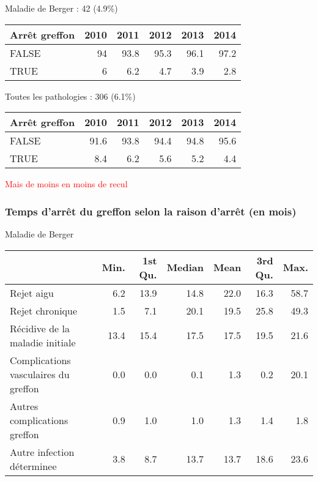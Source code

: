 \documentclass[11pt,a4paper]{article}\usepackage[]{graphicx}\usepackage[]{color}
\begin{document}
Maladie de Berger : 42 (4.9\%)

\begin{table}[H]
\centering
\begin{tabular}{lrrrrr}
  \hline
Arrêt greffon & 2010 & 2011 & 2012 & 2013 & 2014 \\ 
  \hline
FALSE & 94 & 93.8 & 95.3 & 96.1 & 97.2 \\ 
  TRUE & 6 & 6.2 & 4.7 & 3.9 & 2.8 \\ 
   \hline
\end{tabular}
\end{table}


Toutes les pathologies : 306 (6.1\%)

\begin{table}[H]
\centering
\begin{tabular}{lrrrrr}
  \hline
Arrêt greffon & 2010 & 2011 & 2012 & 2013 & 2014 \\ 
  \hline
FALSE & 91.6 & 93.8 & 94.4 & 94.8 & 95.6 \\ 
  TRUE & 8.4 & 6.2 & 5.6 & 5.2 & 4.4 \\ 
   \hline
\end{tabular}
\end{table}


\textcolor{red}{Mais de moins en moins de recul}

    \subsubsection{Temps d'arrêt du greffon selon la raison d'arrêt (en mois)}

Maladie de Berger

\begin{table}[H]
\centering
\begin{tabular}{lrrrrrr}
  \hline
 & Min. & 1st Qu. & Median & Mean & 3rd Qu. & Max. \\ 
  \hline
Rejet aigu & 6.2 & 13.9 & 14.8 & 22.0 & 16.3 & 58.7 \\ 
  Rejet chronique & 1.5 & 7.1 & 20.1 & 19.5 & 25.8 & 49.3 \\ 
  Récidive de la maladie initiale & 13.4 & 15.4 & 17.5 & 17.5 & 19.5 & 21.6 \\ 
  Complications vasculaires du greffon & 0.0 & 0.0 & 0.1 & 1.3 & 0.2 & 20.1 \\ 
  Autres complications greffon & 0.9 & 1.0 & 1.0 & 1.3 & 1.4 & 1.8 \\ 
  Autre infection déterminee & 3.8 & 8.7 & 13.7 & 13.7 & 18.6 & 23.6 \\ 
   \hline
\end{tabular}
\end{table}
\end{document}
